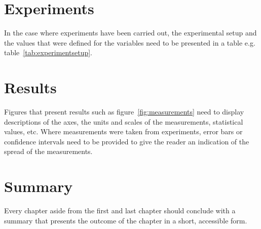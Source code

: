\section{Experiments}
In the case where experiments have been carried out, the experimental setup and the values that were defined for the variables need to be presented in a table e.g. table~\ref{tab:experimentsetup}.




\section{Results}

Figures that present results such as figure~\ref{fig:measurements} need to display descriptions of the axes, the units and scales of the measurements, statistical values, etc. Where measurements were taken from experiments, error bars or confidence intervals need to be provided to give the reader an indication of the spread of the measurements.



\section{Summary}

Every chapter aside from the first and last chapter should conclude with a summary that presents the outcome of the chapter in a short, accessible form. 